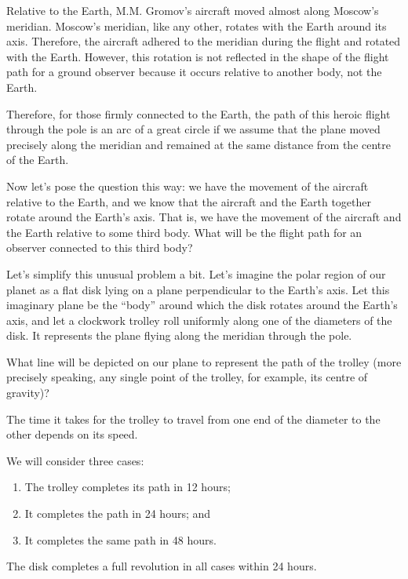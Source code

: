 Relative to the Earth, M.M. Gromov's aircraft moved almost along Moscow's meridian. Moscow's meridian, like any other, rotates with the Earth around its axis. Therefore, the aircraft adhered to the meridian during the flight and rotated with the Earth. However, this rotation is not reflected in the shape of the flight path for a ground observer because it occurs relative to another body, not the Earth.

Therefore, for those firmly connected to the Earth, the path of this heroic flight through the pole is an arc of a great circle if we assume that the plane moved precisely along the meridian and remained at the same distance from the centre of the Earth.

Now let's pose the question this way: we have the movement of the aircraft relative to the Earth, and we know that the aircraft and the Earth together rotate around the Earth's axis. That is, we have the movement of the aircraft and the Earth relative to some third body. What will be the flight path for an observer connected to this third body?

Let's simplify this unusual problem a bit. Let's imagine the polar region of our planet as a flat disk lying on a plane perpendicular to the Earth's axis. Let this imaginary plane be the ``body'' around which the disk rotates around the Earth's axis, and let a clockwork trolley roll uniformly along one of the diameters of the disk. It represents the plane flying along the meridian through the pole.

What line will be depicted on our plane to represent the path of the trolley (more precisely speaking, any single point of the trolley, for example, its centre of gravity)?

The time it takes for the trolley to travel from one end of the diameter to the other depends on its speed.

We will consider three cases:
\begin{enumerate}
\item The trolley completes its path in 12 hours;
\item It completes the path in 24 hours; and
\item It completes the same path in 48 hours.
\end{enumerate}
The disk completes a full revolution in all cases within 24 hours.



